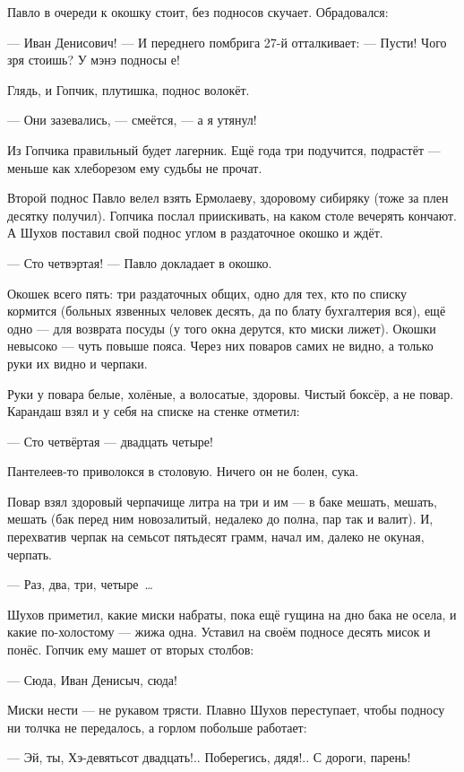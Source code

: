 Павло в очереди к окошку стоит, без подносов скучает. Обрадовался:

--- Иван Денисович! --- И переднего помбрига 27-й отталкивает: --- Пусти! Чого зря стоишь? У мэнэ 
подносы е!

Глядь, и Гопчик, плутишка, поднос волокёт.

--- Они зазевались, --- смеётся, --- а я утянул!

Из Гопчика правильный будет лагерник. Ещё года три подучится, подрастёт --- меньше как 
хлеборезом ему судьбы не прочат.

Второй поднос Павло велел взять Ермолаеву, здоровому сибиряку (тоже за плен десятку 
получил). Гопчика послал приискивать, на каком столе вечерять кончают. А Шухов поставил свой 
поднос углом в раздаточное окошко и ждёт.

--- Сто четвэртая! --- Павло докладает в окошко.

Окошек всего пять: три раздаточных общих, одно для тех, кто по списку кормится (больных 
язвенных человек десять, да по блату бухгалтерия вся), ещё одно --- для возврата посуды (у того 
окна дерутся, кто миски лижет). Окошки невысоко --- чуть повыше пояса. Через них поваров самих 
не видно, а только руки их видно и черпаки.

Руки у повара белые, холёные, а волосатые, здоровы. Чистый боксёр, а не повар. Карандаш взял и 
у себя на списке на стенке отметил:

--- Сто четвёртая --- двадцать четыре!

Пантелеев-то приволокся в столовую. Ничего он не болен, сука.

Повар взял здоровый черпачище литра на три и им --- в баке мешать, мешать, мешать (бак перед ним 
новозалитый, недалеко до полна, пар так и валит). И, перехватив черпак на семьсот пятьдесят 
грамм, начал им, далеко не окуная, черпать.

--- Раз, два, три, четыре~\dots{}

Шухов приметил, какие миски набраты, пока ещё гущина на дно бака не осела, и какие 
по-холостому --- жижа одна. Уставил на своём подносе десять мисок и понёс. Гопчик ему машет от 
вторых столбов:

--- Сюда, Иван Денисыч, сюда!

Миски нести --- не рукавом трясти. Плавно Шухов переступает, чтобы подносу ни толчка не 
передалось, а горлом побольше работает:

--- Эй, ты, Хэ-девятьсот двадцать!.. Поберегись, дядя!.. С дороги, парень!

